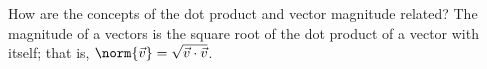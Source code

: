{How are the concepts of the dot product and vector magnitude related?
}
{The magnitude of a vectors is the square root of the dot product of a vector with itself; that is, 
$\norm{\vec v} = \sqrt{\vec v\cdot \vec v}$.
}
